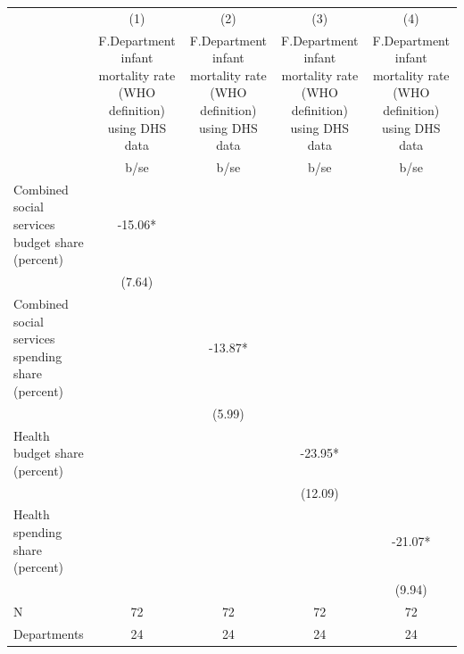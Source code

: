 {
\def\sym#1{\ifmmode^{#1}\else\(^{#1}\)\fi}
\begin{tabular}{l*{4}{c}}
\hline\hline
                                                  &\multicolumn{1}{c}{(1)}&\multicolumn{1}{c}{(2)}&\multicolumn{1}{c}{(3)}&\multicolumn{1}{c}{(4)}\\
                                                  &\multicolumn{1}{c}{F.Department infant mortality rate (WHO definition) using DHS data}&\multicolumn{1}{c}{F.Department infant mortality rate (WHO definition) using DHS data}&\multicolumn{1}{c}{F.Department infant mortality rate (WHO definition) using DHS data}&\multicolumn{1}{c}{F.Department infant mortality rate (WHO definition) using DHS data}\\
                                                  &        b/se   &        b/se   &        b/se   &        b/se   \\
\hline
Combined social services budget share (percent)   &      -15.06*  &               &               &               \\
                                                  &      (7.64)   &               &               &               \\
Combined social services spending share (percent) &               &      -13.87*  &               &               \\
                                                  &               &      (5.99)   &               &               \\
Health budget share (percent)                     &               &               &      -23.95*  &               \\
                                                  &               &               &     (12.09)   &               \\
Health spending share (percent)                   &               &               &               &      -21.07*  \\
                                                  &               &               &               &      (9.94)   \\
\hline
N                                                 &          72   &          72   &          72   &          72   \\
Departments                                       &          24   &          24   &          24   &          24   \\
\hline\hline
\end{tabular}
}
